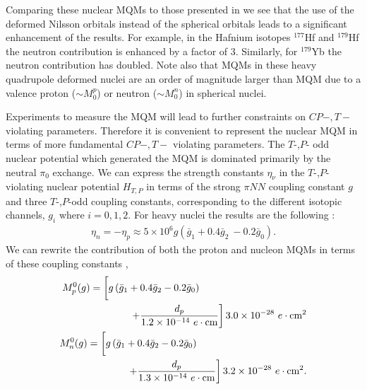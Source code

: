 \documentclass[10pt,a4paper, twoside, openright]{report}
\begin{document}
Comparing these nuclear MQMs to those presented in \cite{Flambaum2014} we see that the use of the deformed Nilsson orbitals instead of the spherical orbitals leads to a  significant enhancement of the results. For example, in the Hafnium isotopes $^{177}$Hf and  $^{179}$Hf the neutron contribution is enhanced by a factor of 3.  Similarly, for $^{179}$Yb the neutron contribution has doubled.  Note also that  MQMs in these heavy quadrupole deformed nuclei are an order of magnitude larger than MQM due to a valence proton   ($ \sim M_{0}^{p}$)  or neutron  ($\sim M_{0}^{n}$) in spherical nuclei.

Experiments to measure the MQM will lead to further constraints on $CP-,T-$ violating parameters. Therefore it is convenient to represent the nuclear MQM in terms of more fundamental $CP-,T-$ violating parameters. The $T$-,$P$- odd nuclear potential which generated the MQM is dominated primarily by the neutral $\pi_0$ exchange. We can express the strength constants $\eta_{\nu}$ in the  $T$-,$P$- violating nuclear potential $H_{T,P}$  in terms of the strong $\pi NN$ coupling constant $g$ and three $T$-,$P$-odd coupling constants, corresponding to the different isotopic  channels,  $g_i$ where $i=0,1,2$. For heavy nuclei the results are the following  \cite{Dmitriev1994, SFK1984}:
\begin{align}
\eta_{n} = -\eta_{p} \approx 5\times 10^{6}g\left(\bar{g}_1 + 0.4 \bar{g}_2\ - 0.2\bar{g}_0\right) .
\end{align}
We can rewrite the contribution of both the proton and nucleon MQMs in terms of these coupling constants \cite{Flambaum1994, Vorov1995},
\begin{align} 
\begin{split}
M_{p}^0(g) &= \left[ \vphantom{\dfrac{1}{2}} g\left(\bar{g}_1 + 0.4\bar{g}_2 - 0.2\bar{g}_0\right) \right. \\
&\qquad \qquad \left. + \dfrac{d_{p}}{1.2 \times 10^{-14} \ e\cdot\text{cm}}\right]3.0 \times 10^{-28} \ e\cdot\text{cm}^2 
\end{split}\label{eq:MQM_pion_p} \\
\begin{split}
M_{n}^0(g) &= \left[ \vphantom{\dfrac{1}{2}} g\left(\bar{g}_1 + 0.4\bar{g}_2 - 0.2\bar{g}_0\right) \right. \\
& \qquad \qquad  \left. + \dfrac{d_{p}}{1.3 \times 10^{-14} \ e\cdot\text{cm}}\right]3.2 \times 10^{-28} \ e\cdot\text{cm}^2. 
\end{split} \label{eq:MQM_pion_n}
\end{align}
\end{document}
